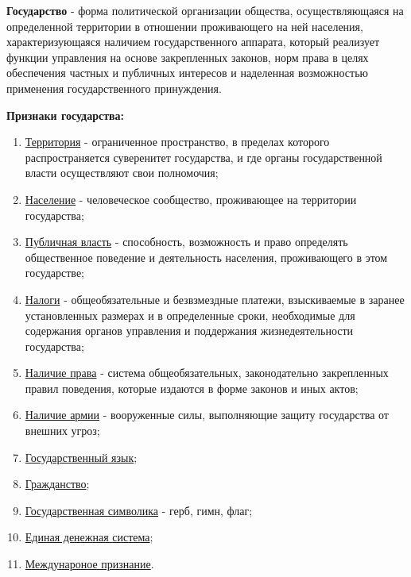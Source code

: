 \documentclass[a5paper,10pt]{article}
\begin{document}
			\textbf{Государство} - форма политической организации общества, осуществляющаяся на определенной территории в отношении проживающего на ней населения, характеризующаяся наличием государственного аппарата, который реализует функции управления на основе закрепленных законов, норм права в целях обеспечения частных и публичных интересов и наделенная возможностью применения государственного принуждения.

			\textbf{Признаки государства:}
			\begin{enumerate}
				\item \underline{Территория} - ограниченное пространство, в пределах которого распространяется суверенитет государства, и где органы государственной власти осуществляют свои полномочия;
				
				\item \underline{Население} - человеческое сообщество, проживающее на территории государства;
				
				\item \underline{Публичная власть} - способность, возможность и право определять общественное поведение и деятельность населения, проживающего в этом государстве;
				
				\item \underline{Налоги} - общеобязательные и безвзмездные платежи, взыскиваемые в заранее установленных размерах и в определенные сроки, необходимые для содержания органов управления и поддержания жизнедеятельности государства;
				
				\item \underline{Наличие права} - система общеобязательных, законодательно закрепленных правил поведения, которые издаются в форме законов и иных актов;
				
				\item \underline{Наличие армии} - вооруженные силы, выполняющие защиту государства от внешних угроз;
				
				\item \underline{Государственный язык};
				
				\item \underline{Гражданство};
				
				\item \underline{Государственная символика} - герб, гимн, флаг;
				
				\item \underline{Единая денежная система};
				
				\item \underline{Междунароное признание}.
			\end{enumerate}
\end{document}

